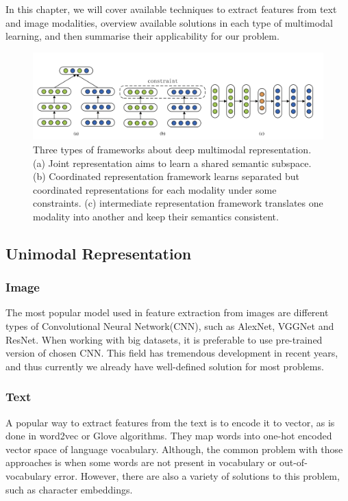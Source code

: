 \documentclass[runningheads]{llncs}
\begin{document}
In this chapter, we will cover available techniques to extract features from text and image modalities, overview available solutions in each type of multimodal learning, and then summarise their applicability for our problem.

\begin{figure}
\includegraphics[width=\textwidth]{multimodal_learning_types.png}
\caption{Three types of frameworks about deep multimodal representation. (a) Joint representation aims to learn a shared semantic subspace.(b) Coordinated representation framework learns separated but coordinated representations for each modality under some constraints.
(c) intermediate representation framework translates one modality into another and keep their semantics consistent.\cite{ref_survey}} \label{fig1}
\end{figure}

\subsection{Unimodal Representation}
\subsubsection{Image}
The most popular model used in feature extraction from images are different types of Convolutional Neural Network(CNN), such as AlexNet\cite{ref_AlexNet}, VGGNet\cite{ref_VGGNet} and ResNet\cite{ref_ResNet}. When working with big datasets, it is preferable to use pre-trained version of chosen CNN. This field has tremendous development in recent years, and thus currently we already have well-defined solution for most problems.

\subsubsection{Text}
A popular way to extract features from the text is to encode it to vector, as is done in word2vec\cite{ref_word2vec} or Glove\cite{ref_glove} algorithms. They map words into one-hot encoded vector space of language vocabulary. Although, the common problem with those approaches is when some words are not present in vocabulary or out-of-vocabulary error. However, there are also a variety of solutions to this problem, such as character embeddings\cite{ref_char_embeddings}. 
\end{document}
